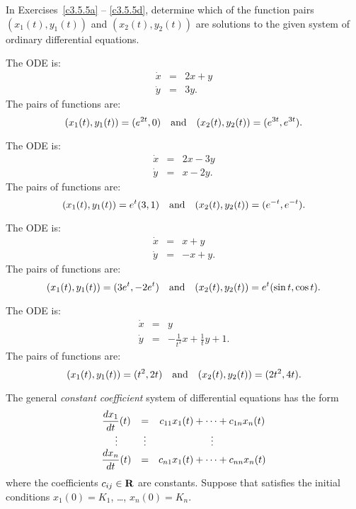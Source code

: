 \noindent In Exercises~\ref{c3.5.5a} -- \ref{c3.5.5d}, determine which of
the function pairs $(x_1(t),y_1(t))$ and $(x_2(t),y_2(t))$ are solutions
to the given system of ordinary differential equations.
\begin{exercise} \label{c3.5.5a}
The ODE is:
\begin{eqnarray*}
\dot{x} & = & 2x+y  \\
\dot{y} & = & 3y.
\end{eqnarray*}
The pairs of functions are:
\[
(x_1(t),y_1(t)) = (e^{2t},0)  \quad\mbox{and}\quad (x_2(t),y_2(t)) = (e^{3t},e^{3t}).
\]
\end{exercise}
\begin{exercise} \label{c3.5.5b}
The ODE is:
\begin{eqnarray*}
\dot{x} & = & 2x - 3y  \\
\dot{y} & = & x - 2y.
\end{eqnarray*}
The pairs of functions are:
\[
(x_1(t),y_1(t)) = e^t(3,1)  \quad\mbox{and}\quad (x_2(t),y_2(t)) = (e^{-t},e^{-t}).
\]
\end{exercise}
\begin{exercise} \label{c3.5.5c}
The ODE is:
\begin{eqnarray*}
\dot{x} & = &  x + y \\
\dot{y} & = & -x + y.
\end{eqnarray*}
The pairs of functions are:
\[
(x_1(t),y_1(t)) =  (3e^t, -2e^t) \quad\mbox{and}\quad (x_2(t),y_2(t)) = e^t(\sin t,\cos t).
\]
\end{exercise}
\begin{exercise} \label{c3.5.5d}
The ODE is:
\begin{eqnarray*}
\dot{x} & = & y  \\
\dot{y} & = &  -\frac{1}{t^2}x + \frac{1}{t}y + 1.
\end{eqnarray*}
The pairs of functions are:
\[
(x_1(t),y_1(t)) = (t^2,2t)  \quad\mbox{and}\quad (x_2(t),y_2(t)) = (2t^2,4t).
\]
\end{exercise}


\label{S:IVP&E} 

The general {\em constant coefficient\/}
system of differential equations has the form
\renewcommand{\arraystretch}{1.8}
\begin{equation}\label{lingen}
\begin{array}{ccc}
\displaystyle \frac{dx_1}{dt}(t) & = & c_{11}x_1(t) + \cdots + c_{1n}x_n(t) \\
\vdots  & \vdots & \vdots \\
\displaystyle \frac{dx_n}{dt}(t) & = & c_{n1}x_1(t) + \cdots + c_{nn}x_n(t)
\end{array}
\end{equation}
\renewcommand{\arraystretch}{1.0}%
where the coefficients $c_{ij}\in \mbox{$\bf{R}$}$ are constants.  Suppose that 
 satisfies the initial conditions $x_1(0) = K_1$, \ldots,  
$x_n(0) = K_n$.

